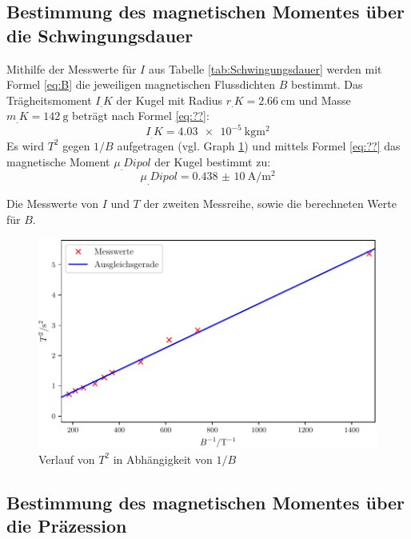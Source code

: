 \subsection{Bestimmung des magnetischen Momentes über die Schwingungsdauer}

Mithilfe der Messwerte für $I$ aus Tabelle \ref{tab:Schwingungsdauer} werden mit Formel \eqref{eq:B} die jeweiligen magnetischen Flussdichten $B$ bestimmt. Das Trägheitsmoment $I_.K$ der Kugel mit Radius $r_.K = \SI{2,66}{\centi\metre}$ und Masse $m_.K = \SI{142}{\gram}$ beträgt nach Formel \eqref{eq:??}:
\begin{equation*}
I_.K = \SI{4,03e-5}{\kilogram\metre\squared}
\end{equation*}
Es wird $T^2$ gegen $1/B$ aufgetragen (vgl. Graph \ref{fig:Schwingungsdauer}) und mittels Formel \eqref{eq:??} das magnetische Moment $\mu_.{Dipol}$ der Kugel bestimmt zu:
\begin{equation*}
\mu_.{Dipol} = \SI{0,438(10)}{\ampere\per\metre\squared}
\end{equation*}  
\begin{table}
  	\centering
  	\caption{Die Messwerte von $I$ und $T$ der zweiten Messreihe, sowie die berechneten Werte für $B$.}
  	\label{tab:Schwingungsdauer}
\end{table}
\begin{figure}
	\centering
	\includegraphics[scale = 1,keepaspectratio]
	{content/images/Schwingungsdauer.pdf}
	\caption{Verlauf von $T^2$ in Abhängigkeit von $1/B$}
	\label{fig:Schwingungsdauer}
\end{figure}

\subsection{Bestimmung des magnetischen Momentes über die Präzession}


